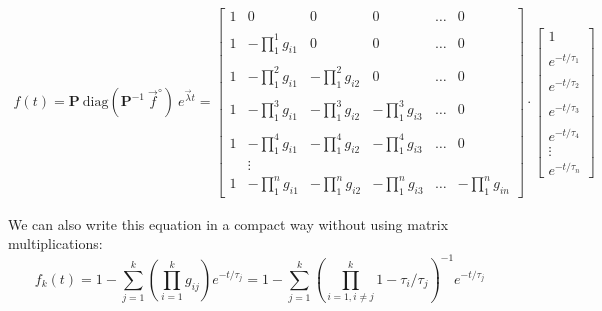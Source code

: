\documentclass{article}
\newcommand{\finit}{\ensuremath{\vec{f}^\circ}}
\begin{document}
\begin{eqnarray}
    f(t) =
    \mathbf{P}~\text{diag}\left(\mathbf{P}^{-1} ~\finit\right)~e^{\vec{\lambda}t} =
    \begin{bmatrix}
        1 & 0 & 0 & 0 & \ldots & 0 \\ \\
        1 & -\prod_1^1 g_{i1} & 0 & 0 & \ldots & 0 \\ \\
        1 & -\prod_1^2 g_{i1} & -\prod_1^2 g_{i2} & 0 & \ldots & 0 \\ \\
        1 & -\prod_1^3 g_{i1} & -\prod_1^3 g_{i2} & -\prod_1^3 g_{i3} & \ldots & 0 \\ \\
        1 & -\prod_1^4 g_{i1} & -\prod_1^4 g_{i2} & -\prod_1^4 g_{i3} & \ldots & 0 \\         & \vdots & & & & \\
        1 & -\prod_1^n g_{i1} & -\prod_1^n g_{i2} & -\prod_1^n g_{i3} &\ldots & -\prod_1^n g_{in}
    \end{bmatrix}
    \cdot
    \begin{bmatrix}
       1 \\ \\
       e^{-t/\tau_1} \\ \\
       e^{-t/\tau_2} \\ \\
       e^{-t/\tau_3} \\ \\
       e^{-t/\tau_4} \\
       \vdots \\
       e^{-t/\tau_n}
    \end{bmatrix}
\end{eqnarray}

We can also write this equation in a compact way without using matrix multiplications:
\begin{equation}
    f_k(t) = 
    1 - \sum_{j=1}^{k} \left(\prod_{i=1}^{k} g_{ij}\right) e^{- t/\tau_j} = 
    1 - \sum_{j=1}^{k} \left(\prod_{i = 1, i \neq j}^{k} 1 - \tau_i/\tau_j\right)^{-1} e^{- t/\tau_j}
\end{equation}
\end{document}
